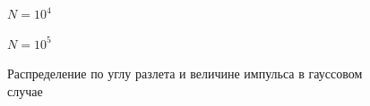 \documentclass[12pt]{article}
\begin{document}
\begin{figure}
\begin{minipage}[h]{0.47\linewidth}
$N = 10^4$ \\
\end{minipage}
\hfill
\begin{minipage}[h]{0.47\linewidth}
$N = 10^5$\\
\end{minipage}
\caption{Распределение по углу разлета и величине импульса в гауссовом случае}
\label{gauss_fig}
\end{figure}
\end{document}
